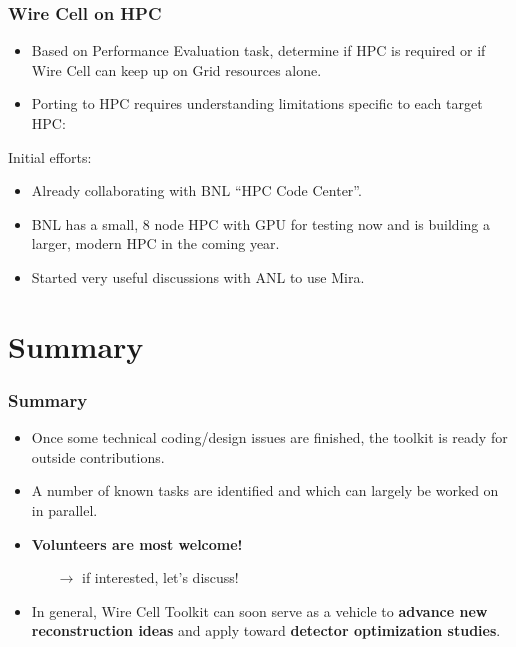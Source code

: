 \documentclass[xcolor=dvipsnames]{beamer}
\begin{document}
\begin{frame}
  \frametitle{Wire Cell on HPC}
  \small
  \begin{itemize}
  \item Based on Performance Evaluation task, determine if HPC is
    required or if Wire Cell can keep up on Grid resources alone.
  \item Porting to HPC requires understanding limitations specific
    to each target HPC:
  \end{itemize}

  Initial efforts:
  \begin{itemize}\footnotesize
  \item Already collaborating with BNL ``HPC Code Center''.
  \item BNL has a small, 8 node HPC with GPU for testing now and is
    building a larger, modern HPC in the coming year.
  \item Started very useful discussions with ANL to use Mira.
  \end{itemize}

\end{frame}

\section{Summary}

\begin{frame}
\end{frame}

\begin{frame}
  \frametitle{Summary}
  \begin{itemize}
  \item Once some technical coding/design issues are finished, the toolkit is ready for outside contributions.
  \item A number of known tasks are identified and which can largely be worked on in parallel.
  \item \textbf{Volunteers are most welcome!}
    \begin{itemize}
    \item[$\rightarrow$] if interested, let's discuss!
    \end{itemize}
  \item In general, Wire Cell Toolkit can soon serve as a vehicle to
    \textbf{advance new reconstruction ideas} and apply toward \textbf{detector optimization studies}.
  \end{itemize}
\end{frame}
\end{document}
